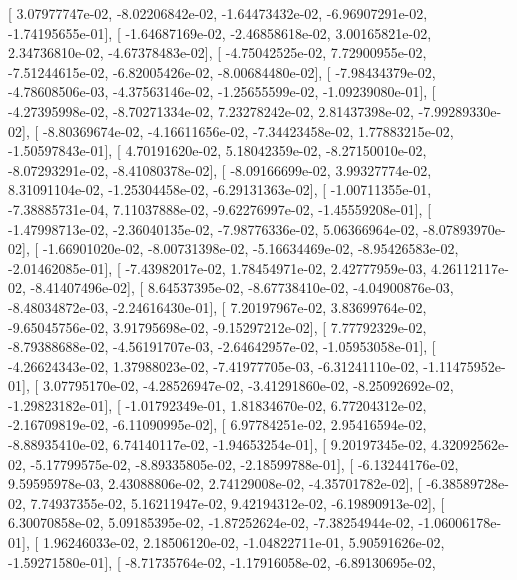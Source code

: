 \documentclass{article}
\begin{document}
       [  3.07977747e-02,  -8.02206842e-02,  -1.64473432e-02,
         -6.96907291e-02,  -1.74195655e-01],
       [ -1.64687169e-02,  -2.46858618e-02,   3.00165821e-02,
          2.34736810e-02,  -4.67378483e-02],
       [ -4.75042525e-02,   7.72900955e-02,  -7.51244615e-02,
         -6.82005426e-02,  -8.00684480e-02],
       [ -7.98434379e-02,  -4.78608506e-03,  -4.37563146e-02,
         -1.25655599e-02,  -1.09239080e-01],
       [ -4.27395998e-02,  -8.70271334e-02,   7.23278242e-02,
          2.81437398e-02,  -7.99289330e-02],
       [ -8.80369674e-02,  -4.16611656e-02,  -7.34423458e-02,
          1.77883215e-02,  -1.50597843e-01],
       [  4.70191620e-02,   5.18042359e-02,  -8.27150010e-02,
         -8.07293291e-02,  -8.41080378e-02],
       [ -8.09166699e-02,   3.99327774e-02,   8.31091104e-02,
         -1.25304458e-02,  -6.29131363e-02],
       [ -1.00711355e-01,  -7.38885731e-04,   7.11037888e-02,
         -9.62276997e-02,  -1.45559208e-01],
       [ -1.47998713e-02,  -2.36040135e-02,  -7.98776336e-02,
          5.06366964e-02,  -8.07893970e-02],
       [ -1.66901020e-02,  -8.00731398e-02,  -5.16634469e-02,
         -8.95426583e-02,  -2.01462085e-01],
       [ -7.43982017e-02,   1.78454971e-02,   2.42777959e-03,
          4.26112117e-02,  -8.41407496e-02],
       [  8.64537395e-02,  -8.67738410e-02,  -4.04900876e-03,
         -8.48034872e-03,  -2.24616430e-01],
       [  7.20197967e-02,   3.83699764e-02,  -9.65045756e-02,
          3.91795698e-02,  -9.15297212e-02],
       [  7.77792329e-02,  -8.79388688e-02,  -4.56191707e-03,
         -2.64642957e-02,  -1.05953058e-01],
       [ -4.26624343e-02,   1.37988023e-02,  -7.41977705e-03,
         -6.31241110e-02,  -1.11475952e-01],
       [  3.07795170e-02,  -4.28526947e-02,  -3.41291860e-02,
         -8.25092692e-02,  -1.29823182e-01],
       [ -1.01792349e-01,   1.81834670e-02,   6.77204312e-02,
         -2.16709819e-02,  -6.11090995e-02],
       [  6.97784251e-02,   2.95416594e-02,  -8.88935410e-02,
          6.74140117e-02,  -1.94653254e-01],
       [  9.20197345e-02,   4.32092562e-02,  -5.17799575e-02,
         -8.89335805e-02,  -2.18599788e-01],
       [ -6.13244176e-02,   9.59595978e-03,   2.43088806e-02,
          2.74129008e-02,  -4.35701782e-02],
       [ -6.38589728e-02,   7.74937355e-02,   5.16211947e-02,
          9.42194312e-02,  -6.19890913e-02],
       [  6.30070858e-02,   5.09185395e-02,  -1.87252624e-02,
         -7.38254944e-02,  -1.06006178e-01],
       [  1.96246033e-02,   2.18506120e-02,  -1.04822711e-01,
          5.90591626e-02,  -1.59271580e-01],
       [ -8.71735764e-02,  -1.17916058e-02,  -6.89130695e-02,
\end{document}
